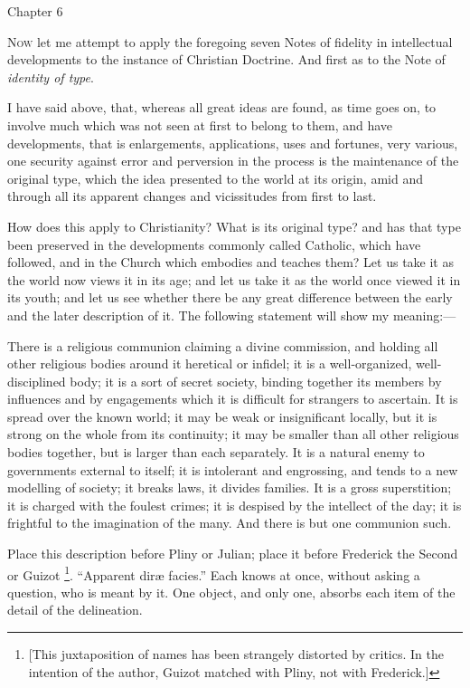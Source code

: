 Chapter 6


N\textsc{ow} let me attempt to apply the foregoing seven Notes
of fidelity in intellectual developments to the instance
of Christian Doctrine. And first as to the Note of \emph{identity
of type}.

I have said above, that, whereas all great ideas are
found, as time goes on, to involve much which was not
seen at first to belong to them, and have developments,
that is enlargements, applications, uses and fortunes,
very various, one security against error and perversion
in the process is the maintenance of the original type,
which the idea presented to the world at its origin, amid
and through all its apparent changes and vicissitudes
from first to last.

How does this apply to Christianity? What is its
original type? and has that type been preserved in the
developments commonly called Catholic, which have
followed, and in the Church which embodies and teaches
them? Let us take it as the world now views it in its
age; and let us take it as the world once viewed it in
its youth; and let us see whether there be any great
difference between the early and the later description of
it. The following statement will show my meaning:—

There is a religious communion claiming a divine
commission, and holding all other religious bodies around
it heretical or infidel; it is a well-organized,
well-disciplined body; it is a sort of secret society,
binding together its members by influences and by
engagements which it is difficult for strangers to
ascertain. It is spread over the known world; it may be
weak or insignificant locally, but it is strong on the
whole from its continuity; it may be smaller than all
other religious bodies together, but is larger than each
separately. It is a natural enemy to governments external
to itself; it is intolerant and engrossing, and tends to
a new modelling of society; it breaks laws, it divides
families. It is a gross superstition; it is charged with
the foulest crimes; it is despised by the intellect of
the day; it is frightful to the imagination of the many.
And there is but one communion such.

Place this description before Pliny or Julian; place
it before Frederick the Second or Guizot \footnote{[This juxtaposition of names has been strangely
distorted by critics. In the intention of the author,
Guizot matched with Pliny, not with Frederick.]}.
``Apparent diræ facies.'' Each knows at once,
without asking a question, who is meant by it. One
object, and only one, absorbs each item of the detail of
the delineation.

